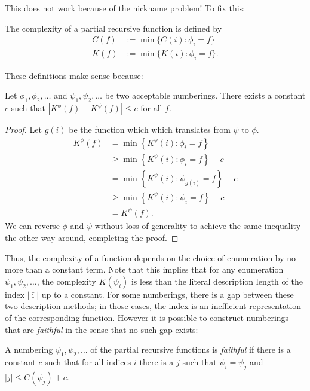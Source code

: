 \documentclass{style/llncs}
\begin{document}
This does not work because of the nickname problem! To fix this:

\begin{definition}
  The complexity of a partial recursive function is defined by
  \begin{align*}
    C(f) &:= \min\{C(i):\phi_i=f\}\\
    K(f) &:= \min\{K(i):\phi_i=f\}.
  \end{align*}
\end{definition}

These definitions make sense because:

\begin{lemma}[Invariance]
Let $\phi_1, \phi_2, \ldots$ and $\psi_1, \psi_2,\ldots$ be two acceptable numberings. There exists a constant $c$ such that $\left| K^\phi(f) - K^\psi(f)\right | \leq c$ for all $f$. \label{lemma:invariance}
\end{lemma}
\begin{proof}
Let $g(i)$ be the function which which translates from $\psi$ to $\phi$.
\begin{align*}
K^\phi(f) &= \min\left\{ K^\phi(i) : \phi_i= f\right\} \\
&\geq \min\left\{ K^\psi(i) : \phi_i= f\right\} - c\\
&= \min\left\{ K^\psi(i) : \psi_{g(i)}= f\right\} - c\\
&\geq \min\left\{ K^\psi(i) : \psi_i= f\right\} - c\\
&= K^\psi(f).
\end{align*}
We can reverse $\phi$ and $\psi$ without loss of generality to achieve the same inequality the other way around, completing the proof.
\end{proof}

Thus, the complexity of a function depends on the choice of
enumeration by no more than a constant term. Note that this implies
that for any enumeration $\psi_1,\psi_2,\ldots$, the complexity $K(\psi_i)$
is less than the literal description length of the index
$|\bar\imath|$ up to a constant. For some numberings, there is a gap
between these two description methods; in those cases, the index is an
inefficient representation of the corresponding function. However it
is possible to construct numberings that are \emph{faithful} in the
sense that no such gap exists:

\begin{definition}\label{def:faithful}
  A numbering $\psi_1,\psi_2,\ldots$ of the partial recursive
  functions is \emph{faithful} if there is a constant $c$ such that
  for all indices $i$ there is a $j$ such that $\psi_i=\psi_j$ and
  $|j|\le C(\psi_j)+c$.
\end{definition}
\end{document}
